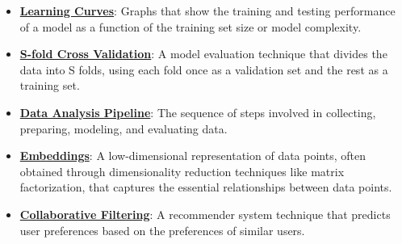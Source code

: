\documentclass{article}%
\begin{document}
\begin{itemize}[leftmargin=*]
\item \href{https://purdue.brightspace.com/d2l/common/assets/pdfjs-d2l-dist/1.0.14-legacy/web/viewer.html?file=%2Fcontent%2Fenforced%2F1095467-wl.202510.CS.24300.001%2F10L1-CrossValidation.pdf%3Fou%3D1095467&lang=en-us&container=d2l-fileviewer-rendered-pdf&fullscreen=d2l-fileviewer-rendered-pdf-dialog&height=667#page=20}{\textbf{Learning Curves}}: Graphs that show the training and testing performance of a model as a function of the training set size or model complexity.%
\item \href{https://purdue.brightspace.com/d2l/common/assets/pdfjs-d2l-dist/1.0.14-legacy/web/viewer.html?file=%2Fcontent%2Fenforced%2F1095467-wl.202510.CS.24300.001%2F10L1-CrossValidation.pdf%3Fou%3D1095467&lang=en-us&container=d2l-fileviewer-rendered-pdf&fullscreen=d2l-fileviewer-rendered-pdf-dialog&height=667#page=25}{\textbf{S-fold Cross Validation}}: A model evaluation technique that divides the data into S folds, using each fold once as a validation set and the rest as a training set.%
\item \href{https://purdue.brightspace.com/d2l/common/assets/pdfjs-d2l-dist/1.0.14-legacy/web/viewer.html?file=%2Fcontent%2Fenforced%2F1095467-wl.202510.CS.24300.001%2F10L1-CrossValidation.pdf%3Fou%3D1095467&lang=en-us&container=d2l-fileviewer-rendered-pdf&fullscreen=d2l-fileviewer-rendered-pdf-dialog&height=667#page=26}{\textbf{Data Analysis Pipeline}}: The sequence of steps involved in collecting, preparing, modeling, and evaluating data.%
\item \href{https://purdue.brightspace.com/d2l/common/assets/pdfjs-d2l-dist/1.0.14-legacy/web/viewer.html?file=%2Fcontent%2Fenforced%2F1095467-wl.202510.CS.24300.001%2F11L2-svd-pca-recommender.pdf%3Fou%3D1095467&lang=en-us&container=d2l-fileviewer-rendered-pdf&fullscreen=d2l-fileviewer-rendered-pdf-dialog&height=667#page=5}{\textbf{Embeddings}}: A low-dimensional representation of data points, often obtained through dimensionality reduction techniques like matrix factorization, that captures the essential relationships between data points.%
\item \href{https://purdue.brightspace.com/d2l/common/assets/pdfjs-d2l-dist/1.0.14-legacy/web/viewer.html?file=%2Fcontent%2Fenforced%2F1095467-wl.202510.CS.24300.001%2F11L2-svd-pca-recommender.pdf%3Fou%3D1095467&lang=en-us&container=d2l-fileviewer-rendered-pdf&fullscreen=d2l-fileviewer-rendered-pdf-dialog&height=667#page=33}{\textbf{Collaborative Filtering}}: A recommender system technique that predicts user preferences based on the preferences of similar users.%

\end{itemize}
\end{document}
